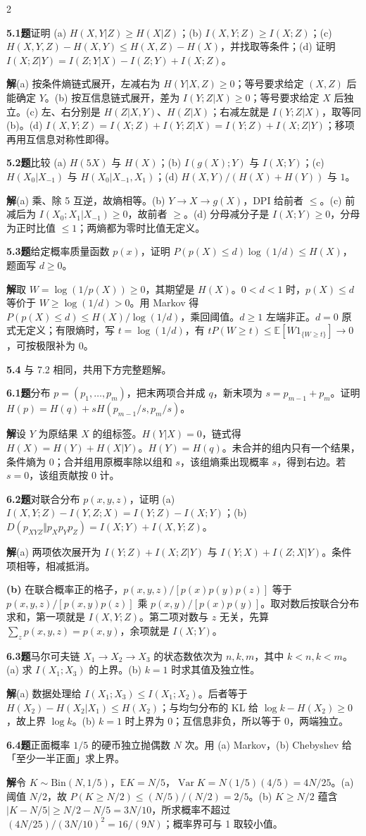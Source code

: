 \documentclass[a4paper]{article}
\newcommand{\cols}{2}
\newcommand{\cols}{4}
\newcommand{\topic}[1]{\par\addvspace{2.6pt}{\color{ink}\bfseries #1}\par\nobreak}
\newcommand{\problem}[2]{\par\addvspace{1.4pt}\textcolor{ink}{\textbf{#1}}\enspace\textbf{题}\enspace #2\par\nobreak}
\newcommand{\solve}{\noindent\textbf{解}\enspace}
\newcommand{\parta}[1]{\par\noindent\textbf{(#1)}\enspace}
\newcommand{\form}[1]{\par\noindent\textbf{#1}\enspace}
\newcommand{\E}{\mathbb E}
\newcommand{\V}{\operatorname{Var}}
\begin{document}
\begin{multicols}{\cols}
\topic{Tut 5 · 基本与概率不等式}
\problem{5.1}{证明 (a) $H(X,Y|Z)\ge H(X|Z)$；(b) $I(X,Y;Z)\ge I(X;Z)$；(c) $H(X,Y,Z)-H(X,Y)\le H(X,Z)-H(X)$，并找取等条件；(d) 证明 $I(X;Z|Y)=I(Z;Y|X)-I(Z;Y)+I(X;Z)$。}
\solve (a) 按条件熵链式展开，左减右为 $H(Y|X,Z)\ge0$；等号要求给定 $(X,Z)$ 后能确定 $Y$。(b) 按互信息链式展开，差为 $I(Y;Z|X)\ge0$；等号要求给定 $X$ 后独立。(c) 左、右分别是 $H(Z|X,Y)$、$H(Z|X)$；右减左就是 $I(Y;Z|X)$，取等同 (b)。(d) $I(X,Y;Z)=I(X;Z)+I(Y;Z|X)=I(Y;Z)+I(X;Z|Y)$；移项再用互信息对称性即得。
\problem{5.2}{比较 (a) $H(5X)$ 与 $H(X)$；(b) $I(g(X);Y)$ 与 $I(X;Y)$；(c) $H(X_0|X_{-1})$ 与 $H(X_0|X_{-1},X_1)$；(d) $H(X,Y)/(H(X)+H(Y))$ 与 $1$。}
\solve (a) 乘、除 5 互逆，故熵相等。(b) $Y\to X\to g(X)$，DPI 给前者 $\le$。(c) 前减后为 $I(X_0;X_1|X_{-1})\ge0$，故前者 $\ge$。(d) 分母减分子是 $I(X;Y)\ge0$，分母为正时比值 $\le1$；两熵都为零时比值无定义。
\problem{5.3}{给定概率质量函数 $p(x)$，证明 $P(p(X)\le d)\log(1/d)\le H(X)$，题面写 $d\ge0$。}
\solve 取 $W=\log(1/p(X))\ge0$，其期望是 $H(X)$。$0<d<1$ 时，$p(X)\le d$ 等价于 $W\ge\log(1/d)>0$。用 Markov 得 $P(p(X)\le d)\le H(X)/\log(1/d)$，乘回阈值。$d\ge1$ 左端非正。$d=0$ 原式无定义；有限熵时，写 $t=\log(1/d)$，有 $tP(W\ge t)\le\E[W1_{\{W\ge t\}}]\to0$，可按极限补为 0。
\form{5.4} 与 7.2 相同，共用下方完整题解。

\topic{Tut 6 · 熵分组、KL、Markov 链}
\problem{6.1}{分布 $p=(p_1,\ldots,p_m)$，把末两项合并成 $q$，新末项为 $s=p_{m-1}+p_m$。证明 $H(p)=H(q)+sH(p_{m-1}/s,p_m/s)$。}
\solve 设 $Y$ 为原结果 $X$ 的组标签。$H(Y|X)=0$，链式得 $H(X)=H(Y)+H(X|Y)$。$H(Y)=H(q)$。未合并的组内只有一个结果，条件熵为 0；合并组用原概率除以组和 $s$，该组熵乘出现概率 $s$，得到右边。若 $s=0$，该组贡献按 0 计。
\problem{6.2}{对联合分布 $p(x,y,z)$，证明 (a) $I(X,Y;Z)-I(Y,Z;X)=I(Y;Z)-I(X;Y)$；(b) $D(p_{XYZ}\Vert p_Xp_Yp_Z)=I(X;Y)+I(X,Y;Z)$。}
\solve (a) 两项依次展开为 $I(Y;Z)+I(X;Z|Y)$ 与 $I(Y;X)+I(Z;X|Y)$。条件项相等，相减抵消。
\parta{b} 在联合概率正的格子，$p(x,y,z)/[p(x)p(y)p(z)]$ 等于 $p(x,y,z)/[p(x,y)p(z)]$ 乘 $p(x,y)/[p(x)p(y)]$。取对数后按联合分布求和，第一项就是 $I(X,Y;Z)$。第二项对数与 $z$ 无关，先算 $\sum_zp(x,y,z)=p(x,y)$，余项就是 $I(X;Y)$。
\problem{6.3}{马尔可夫链 $X_1\to X_2\to X_3$ 的状态数依次为 $n,k,m$，其中 $k<n,k<m$。(a) 求 $I(X_1;X_3)$ 的上界。(b) $k=1$ 时求其值及独立性。}
\solve (a) 数据处理给 $I(X_1;X_3)\le I(X_1;X_2)$。后者等于 $H(X_2)-H(X_2|X_1)\le H(X_2)$；与均匀分布的 KL 给 $\log k-H(X_2)\ge0$，故上界 $\log k$。(b) $k=1$ 时上界为 0；互信息非负，所以等于 0，两端独立。
\problem{6.4}{正面概率 $1/5$ 的硬币独立抛偶数 $N$ 次。用 (a) Markov，(b) Chebyshev 给「至少一半正面」求上界。}
\solve 令 $K\sim\mathrm{Bin}(N,1/5)$，$\E K=N/5$，$\V K=N(1/5)(4/5)=4N/25$。(a) 阈值 $N/2$，故 $P(K\ge N/2)\le(N/5)/(N/2)=2/5$。(b) $K\ge N/2$ 蕴含 $|K-N/5|\ge N/2-N/5=3N/10$，所求概率不超过 $(4N/25)/(3N/10)^2=16/(9N)$；概率界可与 1 取较小值。


\end{multicols}
\end{document}

